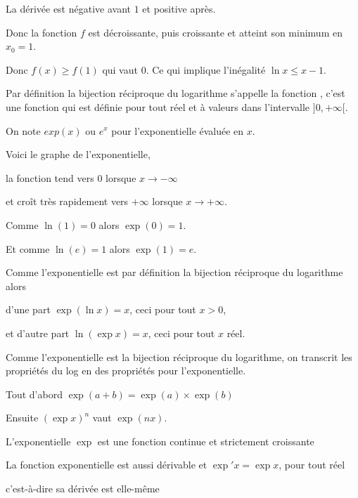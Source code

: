 La dérivée est négative avant $1$ et positive après.

\change

Donc la fonction $f$ est décroissante, puis croissante et 
atteint son minimum en $x_0=1$.

\change

  Donc $f(x)\ge f(1)$ qui vaut $0$. Ce qui implique l'inégalité $\ln x \le x-1$.
  
\diapo


Par définition la bijection réciproque du logarithme s'appelle la 
fonction , c'est une fonction qui est définie pour tout réel et à valeurs dans l'intervalle $]0,+\infty[$. 

On note $exp(x)$ ou $e^x$ pour l'exponentielle évaluée en $x$.

Voici le graphe de l'exponentielle,

la fonction tend vers $0$ lorsque $x\to -\infty$

et croît très rapidement vers $+\infty$ lorsque $x\to+\infty$.

Comme $\ln(1)=0$ alors $\exp(0)=1$.

Et comme $\ln(e)=1$ alors $\exp(1)=e$.


\diapo

Comme l'exponentielle est par définition la bijection réciproque du logarithme alors

d'une part 
$\exp(\ln x) = x$, ceci pour tout $x >0$,

\change

et d'autre part $\ln(\exp x) = x$, ceci pour tout $x$ réel.

\change

Comme l'exponentielle est la bijection réciproque du logarithme, on transcrit les propriétés du log
en des propriétés pour l'exponentielle.


Tout d'abord $\exp(a+b) = \exp(a) \times \exp(b)$

\change

Ensuite $(\exp x)^n$ vaut $\exp(nx)$.

\change

L'exponentielle $\exp$ est une fonction continue et strictement croissante

\change

 La fonction exponentielle est aussi dérivable et $\exp' x = \exp x$, pour tout réel
 
c'est-à-dire sa dérivée est elle-même 

